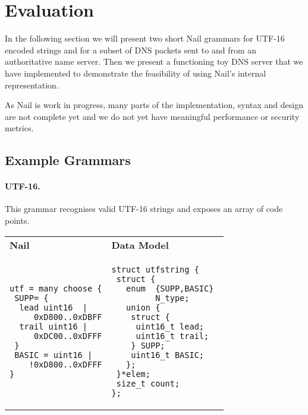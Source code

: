 \section{Evaluation}

\label{s:eval}
In the following section we will present two short Nail grammars for UTF-16
encoded strings and for a subset of DNS packets sent to and from an
authoritative name server. Then we present a functioning toy DNS server that we
have implemented to demonstrate the feasibility of using Nail's internal
representation.

As Nail is work in progress, many parts of the implementation, syntax and design
are not complete yet and we do not yet have meaningful performance or security metrics.

\subsection{Example Grammars}
\paragraph{UTF-16.}
This grammar recognises valid UTF-16 strings and exposes an array of code
points.
\hspace{-2em}\begin{tabular}{ll}
  \textbf{Nail} & \textbf{Data Model}\\
  \begin{minipage}{1.3in}
\begin{verbatim}
utf = many choose {
 SUPP= {
  lead uint16  |
     0xD800..0xDBFF
  trail uint16 | 
     0xDC00..0xDFFF
 }
 BASIC = uint16 |
    !0xD800..0xDFFF
}
\end{verbatim}
  \end{minipage}
  & 
  \begin{minipage}{2in}
\begin{verbatim}
struct utfstring {
 struct {
   enum  {SUPP,BASIC} 
         N_type;
   union {
    struct {
     uint16_t lead;
     uint16_t trail;
    } SUPP;
    uint16_t BASIC;
   };
 }*elem;
 size_t count;
};
\end{verbatim} 
  \end{minipage}
  \\
\end{tabular}

